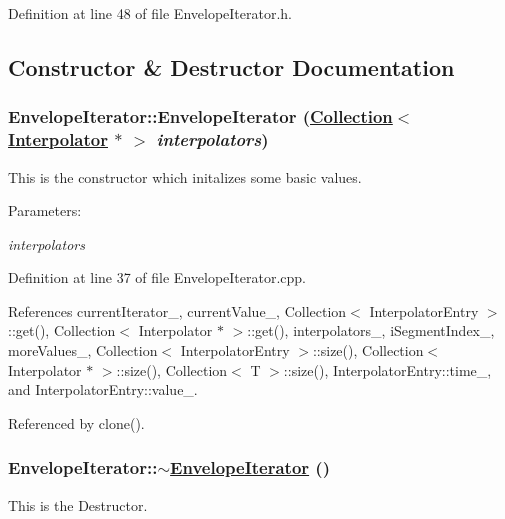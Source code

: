 Definition at line 48 of file Envelope\-Iterator.h.

\subsection{Constructor \& Destructor Documentation}
\hypertarget{classEnvelopeIterator_a0}{
\subsubsection[EnvelopeIterator]{\setlength{\rightskip}{0pt plus 5cm}Envelope\-Iterator::Envelope\-Iterator (\hyperlink{classCollection}{Collection}$<$ \hyperlink{classInterpolator}{Interpolator} $\ast$ $>$ {\em interpolators})}}
\label{classEnvelopeIterator_a0}


This is the constructor which initalizes some basic values. \begin{Desc}
\item[Parameters:]
\begin{description}
\item[{\em interpolators}]\end{description}
\end{Desc}


Definition at line 37 of file Envelope\-Iterator.cpp.

References current\-Iterator\_\-, current\-Value\_\-, Collection$<$ Interpolator\-Entry $>$::get(), Collection$<$ Interpolator $\ast$ $>$::get(), interpolators\_\-, i\-Segment\-Index\_\-, more\-Values\_\-, Collection$<$ Interpolator\-Entry $>$::size(), Collection$<$ Interpolator $\ast$ $>$::size(), Collection$<$ T $>$::size(), Interpolator\-Entry::time\_\-, and Interpolator\-Entry::value\_\-.

Referenced by clone().\hypertarget{classEnvelopeIterator_a1}{
\subsubsection[$\sim$EnvelopeIterator]{\setlength{\rightskip}{0pt plus 5cm}Envelope\-Iterator::$\sim$\hyperlink{classEnvelopeIterator}{Envelope\-Iterator} ()}}
\label{classEnvelopeIterator_a1}


This is the Destructor. 

